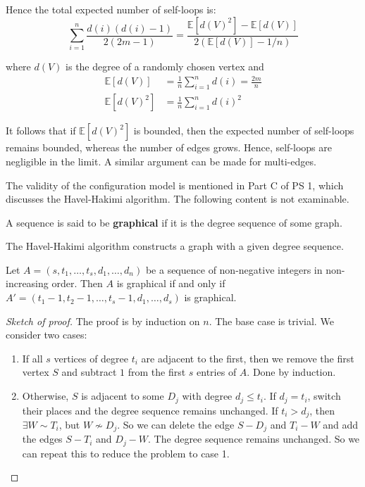 \documentclass{article}
\begin{document}
Hence the total expected number of self-loops is:
\begin{equation*}
    \sum_{i=1}^{n}\frac{d(i)(d(i)-1)}{2(2m-1)}=\frac{\mathbb{E}[d(V)^{2}]-\mathbb{E}[d(V)]}{2(\mathbb{E}[d(V)]-1/n)}
\end{equation*}

where $d(V)$ is the degree of a randomly chosen vertex and 
\begin{align*}
    \mathbb{E}[d(V)] &= \frac{1}{n} \sum_{i=1}^{n} d(i) = \frac{2m}{n} \\
    \mathbb{E}[d(V)^{2}] &= \frac{1}{n} \sum_{i=1}^{n} d(i)^{2}
\end{align*}

It follows that if $\mathbb{E}[d(V)^{2}]$ is bounded, then the expected number of self-loops remains bounded, whereas the number of edges grows. Hence, self-loops are negligible in the limit. A similar argument can be made for multi-edges.  

\begin{unexaminable}
    The validity of the configuration model is mentioned in Part C of PS 1, which discusses the Havel-Hakimi algorithm. The following content is not examinable.
\end{unexaminable}

\begin{definition}
    A sequence is said to be \textbf{graphical} if it is the degree sequence of some graph.
\end{definition}

The Havel-Hakimi algorithm constructs a graph with a given degree sequence.
\begin{theorem}
    Let $A=(s, t_1, \ldots, t_s, d_1, \ldots, d_n)$ be a sequence of non-negative integers in non-increasing order. Then $A$ is graphical if and only if $A'=(t_1-1, t_2-1, \ldots, t_s-1, d_1, \ldots, d_s)$ is graphical.
\end{theorem}
\begin{proof}[Sketch of proof]
    The proof is by induction on $n$. The base case is trivial. We consider two cases: 
    \begin{enumerate}
        \item If all $s$ vertices of degree $t_i$ are adjacent to the first, then we remove the first vertex $S$ and subtract $1$ from the first $s$ entries of $A$. Done by induction.
        \item Otherwise, $S$ is adjacent to some $D_j$ with degree $d_j \leq t_i$. If $d_j=t_i$, switch their places and the degree sequence remains unchanged. If $t_i>d_j$, then $\exists W \sim T_i$, but $W \nsim D_j$. So we can delete the edge $S-D_j$ and $T_i-W$ and add the edges $S-T_i$ and $D_j-W$. The degree sequence remains unchanged. So we can repeat this to reduce the problem to case 1.
    \end{enumerate}
\end{proof}
\end{document}

